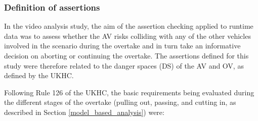 %


\subsubsection{Definition of assertions}
\label{DS_assessment}
In the video analysis study, the aim of the assertion checking applied to runtime data was to assess whether the AV risks colliding with any of the other vehicles involved in the scenario during the overtake and in turn take an informative decision on aborting or continuing the overtake. The assertions defined for this study were therefore related to the danger spaces (DS) of the AV and OV, as defined by the UKHC.

%
Following Rule 126 of the UKHC, the basic requirements being evaluated during the different stages of the overtake (pulling out, passing, and cutting in, as described in Section \ref{model_based_analysis}) were:
%
%
%


